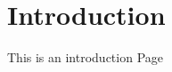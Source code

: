 \documentclass[../main.tex]{subfiles}
\begin{document}
  \section{Introduction}
  This is an introduction Page
\end{document}
